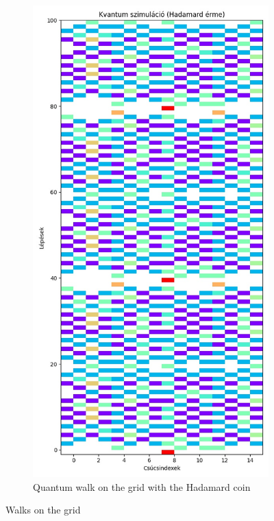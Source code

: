 \begin{figure}[H]
\begin{subfigure}{.45\linewidth}
  \end{subfigure}
  \begin{subfigure}{.45\linewidth}
    \centering
    \includegraphics[width=\linewidth]{./figures/results/grid/hadamard.jpg}
    \caption{Quantum walk on the grid with the Hadamard coin}
  \end{subfigure}
  \caption{Walks on the grid}
  \label{fig:all}
\end{figure}

